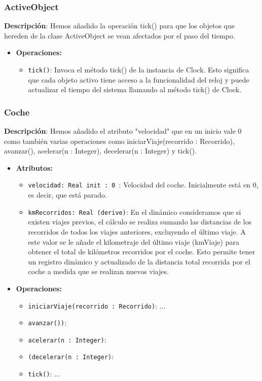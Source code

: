 \documentclass[12pt.a4paper]{article}
\begin{document}
\subsubsection{ActiveObject}
\textbf{Descripción}:  Hemos añadido la operación tick() para que los objetos que hereden de la clase ActiveObject se vean afectados por el paso del tiempo.
\begin{itemize}
    \item \textbf{Operaciones:}
    \begin{itemize}
        \item \texttt{tick()}: Invoca el método tick() de la instancia de Clock. Esto significa que cada objeto activo tiene acceso a la funcionalidad del reloj y puede actualizar el tiempo del sistema llamando al método tick() de Clock.
    \end{itemize}
\end{itemize}

\subsubsection{Coche}
\textbf{Descripción}:  Hemos añadido el atributo "velocidad" que en un inicio vale 0 como también varias operaciones como iniciarViaje(recorrido : Recorrido), avanzar(), acelerar(n : Integer), decelerar(n : Integer) y tick().
\begin{itemize}
    \item \textbf{Atributos:}
    \begin{itemize}
        \item \texttt{velocidad: Real init : 0 }: Velocidad del coche. Inicialmente está en 0, es decir, que está parado.
        \item \texttt{kmRecorridos: Real (derive)}: En el dinámico consideramos que si existen viajes previos, el cálculo se realiza sumando las distancias de los recorridos de todos los viajes anteriores, excluyendo el último viaje. A este valor se le añade el kilometraje del último viaje (kmViaje) para obtener el total de kilómetros recorridos por el coche. Esto permite tener un registro dinámico y actualizado de la distancia total recorrida por el coche a medida que se realizan nuevos viajes.
    \end{itemize}
    \item \textbf{Operaciones:}
    \begin{itemize}
        \item \texttt{iniciarViaje(recorrido : Recorrido)}: ...
        \item \texttt{avanzar())}:
        \item \texttt{acelerar(n : Integer)}:
        \item \texttt{(decelerar(n : Integer)}:
        \item \texttt{tick()}: ...
    \end{itemize}
\end{itemize}
\end{document}

